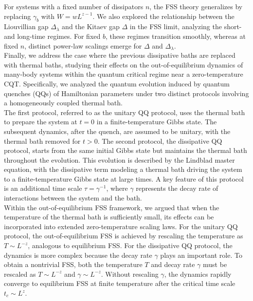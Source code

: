     For systems with a fixed number of dissipators \( n \), the FSS theory generalizes by replacing \( \gamma_b \) with \( W = wL^{z-1} \). We also explored the relationship between the Liouvillian gap \( \Delta_\lambda \) and the Kitaev gap \( \Delta \) in the FSS limit, analyzing the short- and long-time regimes. For fixed \( b \), these regimes transition smoothly, whereas at fixed \( n \), distinct power-law scalings emerge for \( \Delta \) and \( \Delta_\lambda \).
    \\$ $\\
    Finally, we address the case where the previous dissipative baths are replaced with thermal baths, studying their effects on the out-of-equilibrium dynamics of many-body systems within the quantum critical regime near a zero-temperature CQT.
    Specifically, we analyzed the quantum evolution induced by quantum quenches (QQs) of Hamiltonian parameters under two distinct protocols involving a homogeneously coupled thermal bath.\\
    The first protocol, referred to as the unitary QQ protocol, uses the thermal bath to prepare the system at \( t = 0 \) in a finite-temperature Gibbs state. The subsequent dynamics, after the quench, are assumed to be unitary, with the thermal bath removed for \( t > 0 \). The second protocol, the dissipative QQ protocol, starts from the same initial Gibbs state but maintains the thermal bath throughout the evolution. This evolution is described by the Lindblad master equation, with the dissipative term modeling a thermal bath driving the system to a finite-temperature Gibbs state at large times. A key feature of this protocol is an additional time scale \( \tau = \gamma^{-1} \), where \( \gamma \) represents the decay rate of interactions between the system and the bath.\\
    Within the out-of-equilibrium FSS framework, we argued that when the temperature of the thermal bath is sufficiently small, its effects can be incorporated into extended zero-temperature scaling laws. For the unitary QQ protocol, the out-of-equilibrium FSS is achieved by rescaling the temperature as \( T \sim L^{-z} \), analogous to equilibrium FSS. For the dissipative QQ protocol, the dynamics is more complex because the decay rate \( \gamma \) plays an important role. To obtain a nontrivial FSS, both the temperature \( T \) and decay rate \( \gamma \) must be rescaled as \( T \sim L^{-z} \) and \( \gamma \sim L^{-z} \). Without rescaling \( \gamma \), the dynamics rapidly converge to equilibrium FSS at finite temperature after the critical time scale \( t_c \sim L^z \).\\
